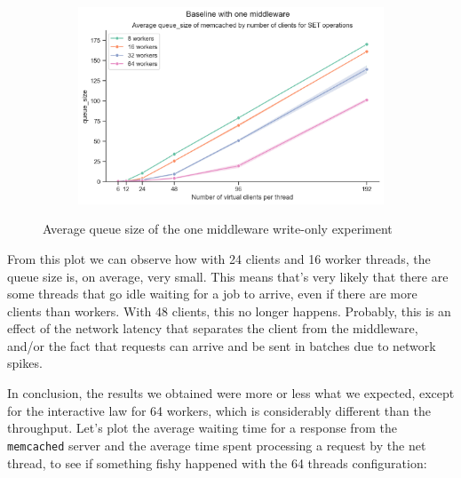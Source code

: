 \documentclass[11pt,a4paper]{article}
\renewcommand{\t}[1]{%
	{\texttt{#1}}}
\begin{document}
\begin{itemize}
\begin{figure}[H]
			\begin{subfigure}[b]{0.5\linewidth}
				\includegraphics[width=\linewidth]{images/middleware_1/last_graph_set_queue_size.pdf}
			\end{subfigure}
			\caption{Average queue size of the one middleware write-only experiment}
			\label{fig:boat1}
		\end{figure}
		From this plot we can observe how with 24 clients and 16 worker
		threads, the queue size is, on average, very small.  This means that's
		very likely that there are some threads that go idle waiting for a job
		to arrive, even if there are more clients than workers. With 48
		clients, this no longer happens. Probably, this is an effect of the
		network latency that separates the client from the middleware, and/or the
		fact that requests can arrive and be sent in batches due to network
		spikes.
\end{itemize}

In conclusion, the results we obtained were more or less what we expected, except for the interactive law for 64 workers, which is considerably different than the throughput. Let's plot the average waiting time for a response from the \t{memcached} server and the average time spent processing a request by the net thread, to see if something fishy happened with the 64 threads configuration:
\end{document}
